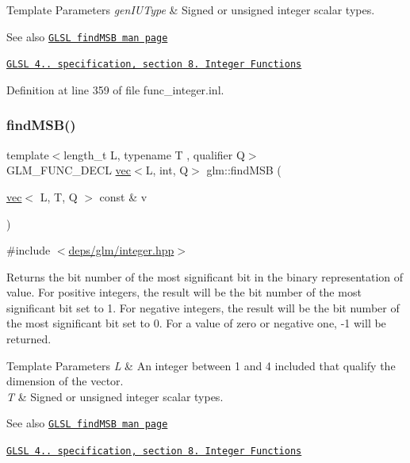 \begin{DoxyTemplParams}{Template Parameters}
{\em gen\+I\+U\+Type} & Signed or unsigned integer scalar types.\\
\hline
\end{DoxyTemplParams}
\begin{DoxySeeAlso}{See also}
\href{http://www.opengl.org/sdk/docs/manglsl/xhtml/findMSB.xml}{\tt G\+L\+SL find\+M\+SB man page} 

\href{http://www.opengl.org/registry/doc/GLSLangSpec.4.20.8.pdf}{\tt G\+L\+SL 4.. specification, section 8. Integer Functions} 
\end{DoxySeeAlso}


Definition at line 359 of file func\+\_\+integer.\+inl.

\mbox{\label{group__core__func__integer_ga39ac4d52028bb6ab08db5ad6562c2872}} 
\subsubsection{\texorpdfstring{find\+M\+S\+B()}{findMSB()}\hspace{0.1cm}{\footnotesize\ttfamily [2/2]}}
{\footnotesize\ttfamily template$<$length\+\_\+t L, typename T , qualifier Q$>$ \\
G\+L\+M\+\_\+\+F\+U\+N\+C\+\_\+\+D\+E\+CL \hyperlink{structglm_1_1vec}{vec}$<$L, int, Q$>$ glm\+::find\+M\+SB (\begin{DoxyParamCaption}\item[{\hyperlink{structglm_1_1vec}{vec}$<$ L, T, Q $>$ const \&}]{v }\end{DoxyParamCaption})}



{\ttfamily \#include $<$\hyperlink{integer_8hpp}{deps/glm/integer.\+hpp}$>$}

Returns the bit number of the most significant bit in the binary representation of value. For positive integers, the result will be the bit number of the most significant bit set to 1. For negative integers, the result will be the bit number of the most significant bit set to 0. For a value of zero or negative one, -\/1 will be returned.


\begin{DoxyTemplParams}{Template Parameters}
{\em L} & An integer between 1 and 4 included that qualify the dimension of the vector. \\
\hline
{\em T} & Signed or unsigned integer scalar types.\\
\hline
\end{DoxyTemplParams}
\begin{DoxySeeAlso}{See also}
\href{http://www.opengl.org/sdk/docs/manglsl/xhtml/findMSB.xml}{\tt G\+L\+SL find\+M\+SB man page} 

\href{http://www.opengl.org/registry/doc/GLSLangSpec.4.20.8.pdf}{\tt G\+L\+SL 4.. specification, section 8. Integer Functions} 
\end{DoxySeeAlso}


